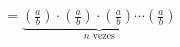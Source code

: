 \documentclass[preview]{standalone}
\begin{document}
\begin{align*}
= \underbrace{\left(\frac{a}{b}\right) \cdot \left(\frac{a}{b}\right) \cdot \left(\frac{a}{b}\right) \cdots \left(\frac{a}{b}\right)}_{n \text{ vezes}}
\end{align*}
\end{document}
